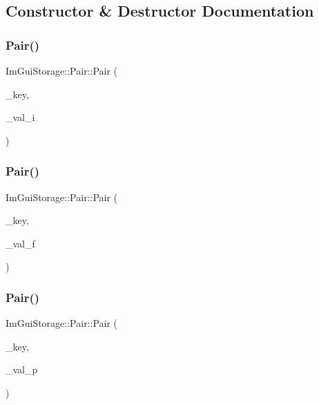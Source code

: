\subsection{Constructor \& Destructor Documentation}
\hypertarget{struct_im_gui_storage_1_1_pair_a37542a22048f0af35e5a6beda6900a0e}{}\label{struct_im_gui_storage_1_1_pair_a37542a22048f0af35e5a6beda6900a0e} 
\subsubsection{\texorpdfstring{Pair()}{Pair()}\hspace{0.1cm}{\footnotesize\ttfamily [1/3]}}
{\footnotesize\ttfamily Im\+Gui\+Storage\+::\+Pair\+::\+Pair (\begin{DoxyParamCaption}\item[{Im\+Gui\+ID}]{\+\_\+key,  }\item[{int}]{\+\_\+val\+\_\+i }\end{DoxyParamCaption})}

\hypertarget{struct_im_gui_storage_1_1_pair_a6f63f598513f2a7a57f2e9ea3b0137b9}{}\label{struct_im_gui_storage_1_1_pair_a6f63f598513f2a7a57f2e9ea3b0137b9} 
\subsubsection{\texorpdfstring{Pair()}{Pair()}\hspace{0.1cm}{\footnotesize\ttfamily [2/3]}}
{\footnotesize\ttfamily Im\+Gui\+Storage\+::\+Pair\+::\+Pair (\begin{DoxyParamCaption}\item[{Im\+Gui\+ID}]{\+\_\+key,  }\item[{float}]{\+\_\+val\+\_\+f }\end{DoxyParamCaption})}

\hypertarget{struct_im_gui_storage_1_1_pair_a4d07d60f83b4e24ee8be9ccceaab76bd}{}\label{struct_im_gui_storage_1_1_pair_a4d07d60f83b4e24ee8be9ccceaab76bd} 
\subsubsection{\texorpdfstring{Pair()}{Pair()}\hspace{0.1cm}{\footnotesize\ttfamily [3/3]}}
{\footnotesize\ttfamily Im\+Gui\+Storage\+::\+Pair\+::\+Pair (\begin{DoxyParamCaption}\item[{Im\+Gui\+ID}]{\+\_\+key,  }\item[{void $\ast$}]{\+\_\+val\+\_\+p }\end{DoxyParamCaption})}



